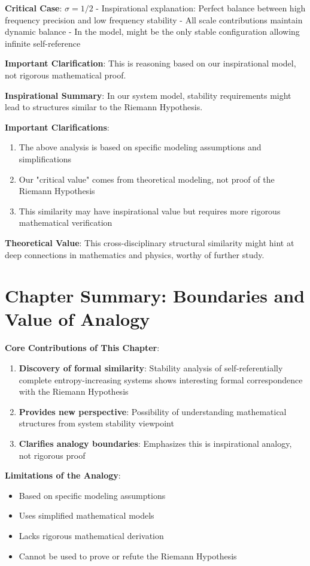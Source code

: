    \textbf{Critical Case}: $\sigma = 1/2$
   - Inspirational explanation: Perfect balance between high frequency precision and low frequency stability
   - All scale contributions maintain dynamic balance
   - In the model, might be the only stable configuration allowing infinite self-reference
   
   \textbf{Important Clarification}: This is reasoning based on our inspirational model, not rigorous mathematical proof.

\textbf{Inspirational Summary}: In our system model, stability requirements might lead to structures similar to the Riemann Hypothesis.

\textbf{Important Clarifications}:
\begin{enumerate}
\item The above analysis is based on specific modeling assumptions and simplifications
\item Our "critical value" comes from theoretical modeling, not proof of the Riemann Hypothesis
\item This similarity may have inspirational value but requires more rigorous mathematical verification
\end{enumerate}

\textbf{Theoretical Value}: This cross-disciplinary structural similarity might hint at deep connections in mathematics and physics, worthy of further study.

\section{Chapter Summary: Boundaries and Value of Analogy}
\label{sec:ch06_riemann:chapter-summary-boundaries-and-value-of-analogy}

\textbf{Core Contributions of This Chapter}:
\begin{enumerate}
\item \textbf{Discovery of formal similarity}: Stability analysis of self-referentially complete entropy-increasing systems shows interesting formal correspondence with the Riemann Hypothesis
\item \textbf{Provides new perspective}: Possibility of understanding mathematical structures from system stability viewpoint
\item \textbf{Clarifies analogy boundaries}: Emphasizes this is inspirational analogy, not rigorous proof
\end{enumerate}

\textbf{Limitations of the Analogy}:
\begin{itemize}
\item Based on specific modeling assumptions
\item Uses simplified mathematical models
\item Lacks rigorous mathematical derivation
\item Cannot be used to prove or refute the Riemann Hypothesis
\end{itemize}


